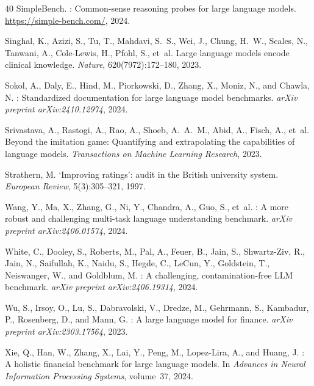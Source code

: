 \documentclass[11pt,a4paper]{article}
\begin{document}
\begin{thebibliography}{40}
SimpleBench.
: Common-sense reasoning probes for large language models.
\newblock \url{https://simple-bench.com/}, 2024.

Singhal, K., Azizi, S., Tu, T., Mahdavi, S.~S., Wei, J., Chung, H.~W., Scales, N., Tanwani, A., Cole-Lewis, H., Pfohl, S., et~al.
\newblock Large language models encode clinical knowledge.
\newblock \emph{Nature}, 620(7972):172--180, 2023.

Sokol, A., Daly, E., Hind, M., Piorkowski, D., Zhang, X., Moniz, N., and Chawla, N.
: Standardized documentation for large language model benchmarks.
\newblock \emph{arXiv preprint arXiv:2410.12974}, 2024.

Srivastava, A., Rastogi, A., Rao, A., Shoeb, A.~A.~M., Abid, A., Fisch, A., et~al.
\newblock Beyond the imitation game: Quantifying and extrapolating the capabilities of language models.
\newblock \emph{Transactions on Machine Learning Research}, 2023.

Strathern, M.
\newblock `{I}mproving ratings': audit in the {B}ritish university system.
\newblock \emph{European Review}, 5(3):305--321, 1997.

Wang, Y., Ma, X., Zhang, G., Ni, Y., Chandra, A., Guo, S., et~al.
: A more robust and challenging multi-task language understanding benchmark.
\newblock \emph{arXiv preprint arXiv:2406.01574}, 2024.

White, C., Dooley, S., Roberts, M., Pal, A., Feuer, B., Jain, S., Shwartz-Ziv, R., Jain, N., Saifullah, K., Naidu, S., Hegde, C., LeCun, Y., Goldstein, T., Neiswanger, W., and Goldblum, M.
: A challenging, contamination-free {LLM} benchmark.
\newblock \emph{arXiv preprint arXiv:2406.19314}, 2024.

Wu, S., Irsoy, O., Lu, S., Dabravolski, V., Dredze, M., Gehrmann, S., Kambadur, P., Rosenberg, D., and Mann, G.
: A large language model for finance.
\newblock \emph{arXiv preprint arXiv:2303.17564}, 2023.

Xie, Q., Han, W., Zhang, X., Lai, Y., Peng, M., Lopez-Lira, A., and Huang, J.
: A holistic financial benchmark for large language models.
\newblock In \emph{Advances in Neural Information Processing Systems}, volume~37, 2024.


\end{thebibliography}
\end{document}
